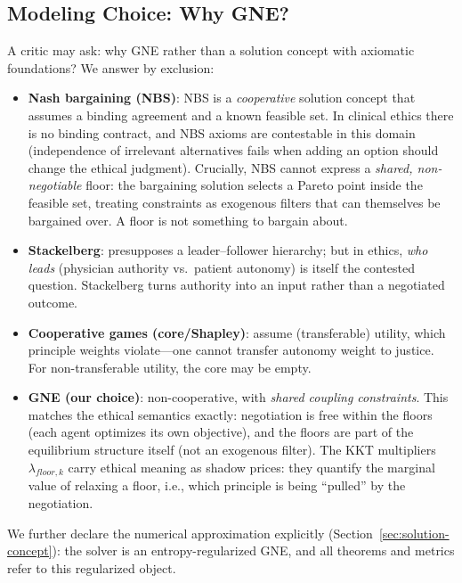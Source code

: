 \documentclass[11pt]{article}
\begin{document}
\subsection{Modeling Choice: Why GNE?}
\label{sec:modeling-choice}
A critic may ask: why GNE rather than a solution concept with axiomatic
foundations? We answer by exclusion:

\begin{itemize}
  \item \textbf{Nash bargaining (NBS)}: NBS is a \emph{cooperative} solution
  concept that assumes a binding agreement and a known feasible set. In
  clinical ethics there is no binding contract, and NBS axioms are
  contestable in this domain (independence of irrelevant alternatives fails
  when adding an option should change the ethical judgment). Crucially, NBS
  cannot express a \emph{shared, non-negotiable} floor: the bargaining
  solution selects a Pareto point inside the feasible set, treating
  constraints as exogenous filters that can themselves be bargained over. A
  floor is not something to bargain about.
  \item \textbf{Stackelberg}: presupposes a leader--follower hierarchy; but
  in ethics, \emph{who leads} (physician authority vs.\ patient autonomy) is
  itself the contested question. Stackelberg turns authority into an input
  rather than a negotiated outcome.
  \item \textbf{Cooperative games (core/Shapley)}: assume (transferable)
  utility, which principle weights violate---one cannot transfer autonomy
  weight to justice. For non-transferable utility, the core may be empty.
  \item \textbf{GNE (our choice)}: non-cooperative, with \emph{shared
  coupling constraints}. This matches the ethical semantics exactly:
  negotiation is free within the floors (each agent optimizes its own
  objective), and the floors are part of the equilibrium structure itself
  (not an exogenous filter). The KKT multipliers $\lambda_{floor,k}$ carry
  ethical meaning as shadow prices: they quantify the marginal value of
  relaxing a floor, i.e., which principle is being ``pulled'' by the
  negotiation.
\end{itemize}
We further declare the numerical approximation explicitly
(Section~\ref{sec:solution-concept}): the solver is an entropy-regularized
GNE, and all theorems and metrics refer to this regularized object.
\end{document}
